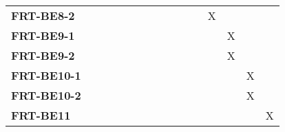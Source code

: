 \documentclass[12pt, titlepage]{article}
\begin{document}
\begin{landscape}
\begin{table}[H]
\begin{tabular}{l|ccccccccccc}
        \textbf{FRT-BE8-2}  & ~ & ~ & ~ & ~ & ~ & ~ & ~ & X & ~ & ~ & ~\\
        \textbf{FRT-BE9-1}  & ~ & ~ & ~ & ~ & ~ & ~ & ~ & ~ & X & ~ & ~\\
        \textbf{FRT-BE9-2}  & ~ & ~ & ~ & ~ & ~ & ~ & ~ & ~ & X & ~ & ~\\
        \textbf{FRT-BE10-1} & ~ & ~ & ~ & ~ & ~ & ~ & ~ & ~ & ~ & X & ~\\
        \textbf{FRT-BE10-2} & ~ & ~ & ~ & ~ & ~ & ~ & ~ & ~ & ~ & X & ~\\
        \textbf{FRT-BE11}   & ~ & ~ & ~ & ~ & ~ & ~ & ~ & ~ & ~ & ~ & X\\
    \end{tabular}
    \label{Traceability Matrix: Functional Requirement}
\end{table}


\end{landscape}
\end{document}
